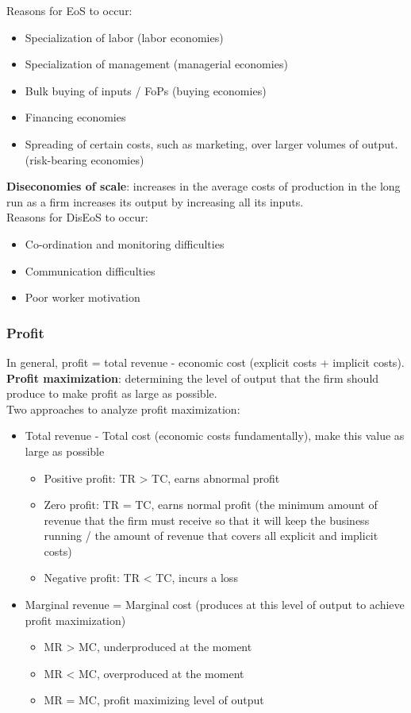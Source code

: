 \documentclass[a4paper,12pt]{article}
\newcommand{\needbold}[1]{\textcolor{red!70!black}{\textbf{#1}}}
\begin{document}
Reasons for EoS to occur:
\begin{itemize}
  \item Specialization of labor (labor economies)
  \item Specialization of management (managerial economies)
  \item Bulk buying of inputs / FoPs (buying economies)
  \item Financing economies
  \item Spreading of certain costs, such as marketing, over larger volumes of output. (risk-bearing economies)
\end{itemize}
\needbold{Diseconomies of scale}: increases in the average costs of production in the long run as a firm increases its output by increasing all its inputs.\\
Reasons for DisEoS to occur: 
\begin{itemize}
  \item Co-ordination and monitoring difficulties
  \item Communication difficulties
  \item Poor worker motivation
\end{itemize}
\subsubsection*{Profit}
In general, profit = total revenue - economic cost (explicit costs + implicit costs).\\
\needbold{Profit maximization}: determining the level of output that the firm should produce to make profit as large as possible.\\
Two approaches to analyze profit maximization:
\begin{itemize}
  \item Total revenue - Total cost (economic costs fundamentally), make this value as large as possible
  \begin{itemize}
    \item Positive profit: TR > TC, earns abnormal profit
    \item Zero profit: TR = TC, earns normal profit (the minimum amount of revenue that the firm must receive so that it will keep the business running / the amount of revenue that covers all explicit and implicit costs)
    \item Negative profit: TR < TC, incurs a loss
  \end{itemize}
  \item Marginal revenue = Marginal cost (produces at this level of output to achieve profit maximization)
  \begin{itemize}
    \item MR > MC, underproduced at the moment
    \item MR < MC, overproduced at the moment
    \item MR = MC, profit maximizing level of output
  \end{itemize}
\end{itemize}
\end{document}
